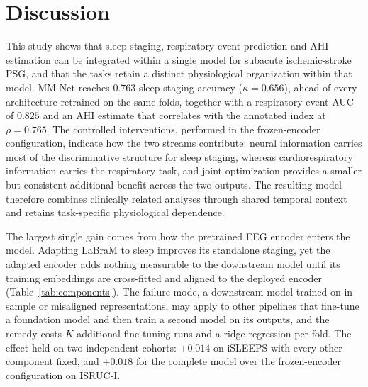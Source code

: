 \documentclass[a4paper,fleqn]{cas-sc}
\newcommand{\mmAcc}{0.763}
\newcommand{\mmK}{0.656}
\newcommand{\mmAuc}{0.825}
\newcommand{\mmRho}{0.765}
\begin{document}
\begin{table}[H]
\caption{Model size and output capability of the evaluated architectures, including whether each model supports sleep staging, respiratory-event prediction, or both.}
\label{tab:cost}
\centering
\setlength{\tabcolsep}{4pt}
\end{table}

\section{Discussion}
\label{sec:discussion}

This study shows that sleep staging, respiratory-event prediction and AHI estimation can be integrated within a single model for subacute ischemic-stroke PSG, and that the tasks retain a distinct physiological organization within that model. MM-Net
reaches $\mmAcc$ sleep-staging accuracy ($\kappa=\mmK$), ahead of every architecture retrained
on the same folds, together with a respiratory-event AUC of $\mmAuc$ and an AHI estimate that
correlates with the annotated index at $\rho=\mmRho$. The controlled interventions, performed in the frozen-encoder configuration, indicate how the two streams contribute: neural information carries most of the discriminative structure for sleep staging, whereas cardiorespiratory information carries the respiratory task, and joint optimization provides a smaller but consistent additional benefit across the two outputs. The resulting model therefore combines clinically related analyses through shared temporal context and retains task-specific physiological dependence.

The largest single gain comes from how the pretrained EEG encoder enters the model. Adapting LaBraM to sleep improves its standalone staging, yet the adapted encoder adds nothing measurable to the downstream model until its training embeddings are cross-fitted and aligned to the deployed encoder (Table~\ref{tab:components}). The failure mode, a downstream model trained on in-sample or misaligned representations, may apply to other pipelines that fine-tune a foundation model and then train a second model on its outputs, and the remedy costs $K$ additional fine-tuning runs and a ridge regression per fold. The effect held on two independent
cohorts: $+0.014$ on iSLEEPS with every other component fixed, and $+0.018$ for the complete model
over the frozen-encoder configuration on ISRUC-I.
\end{document}
